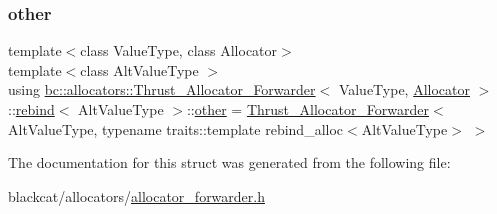 \subsubsection{\texorpdfstring{other}{other}}
{\footnotesize\ttfamily template$<$class Value\+Type, class Allocator$>$ \\
template$<$class Alt\+Value\+Type $>$ \\
using \hyperlink{structbc_1_1allocators_1_1Thrust__Allocator__Forwarder}{bc\+::allocators\+::\+Thrust\+\_\+\+Allocator\+\_\+\+Forwarder}$<$ Value\+Type, \hyperlink{classbc_1_1allocators_1_1Allocator}{Allocator} $>$\+::\hyperlink{structbc_1_1allocators_1_1Thrust__Allocator__Forwarder_1_1rebind}{rebind}$<$ Alt\+Value\+Type $>$\+::\hyperlink{structbc_1_1allocators_1_1Thrust__Allocator__Forwarder_1_1rebind_ac1839568d1ecbf39d4136495cde990a8}{other} =  \hyperlink{structbc_1_1allocators_1_1Thrust__Allocator__Forwarder}{Thrust\+\_\+\+Allocator\+\_\+\+Forwarder}$<$Alt\+Value\+Type, typename traits\+::template rebind\+\_\+alloc$<$Alt\+Value\+Type$>$ $>$}



The documentation for this struct was generated from the following file\+:\begin{DoxyCompactItemize}
\item 
blackcat/allocators/\hyperlink{allocator__forwarder_8h}{allocator\+\_\+forwarder.\+h}\end{DoxyCompactItemize}
